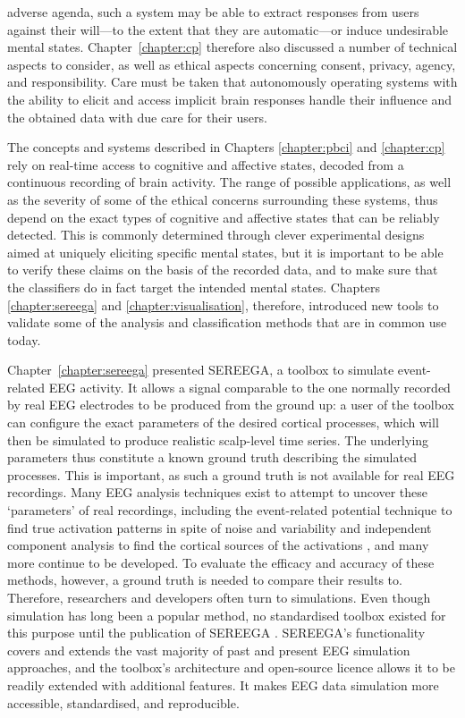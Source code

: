 adverse agenda, such a system may be able to extract responses from users against their will---to the extent that they are automatic---or induce undesirable mental states. Chapter~\ref{chapter:cp} therefore also discussed a number of technical aspects to consider, as well as ethical aspects concerning consent, privacy, agency, and responsibility. Care must be taken that autonomously operating systems with the ability to elicit and access implicit brain responses handle their influence and the obtained data with due care for their users.

The concepts and systems described in Chapters \ref{chapter:pbci} and \ref{chapter:cp} rely on real-time access to cognitive and affective states, decoded from a continuous recording of brain activity. The range of possible applications, as well as the severity of some of the ethical concerns surrounding these systems, thus depend on the exact types of cognitive and affective states that can be reliably detected. This is commonly determined through clever experimental designs aimed at uniquely eliciting specific mental states, but it is important to be able to verify these claims on the basis of the recorded data, and to make sure that the classifiers do in fact target the intended mental states. Chapters \ref{chapter:sereega} and \ref{chapter:visualisation}, therefore, introduced new tools to validate some of the analysis and classification methods that are in common use today.

Chapter~\ref{chapter:sereega} presented SEREEGA, a toolbox to simulate event-related EEG activity. It allows a signal comparable to the one normally recorded by real EEG electrodes to be produced from the ground up: a user of the toolbox can configure the exact parameters of the desired cortical processes, which will then be simulated to produce realistic scalp-level time series. The underlying parameters thus constitute a known ground truth describing the simulated processes. This is important, as such a ground truth is not available for real EEG recordings. Many EEG analysis techniques exist to attempt to uncover these `parameters' of real recordings, including the event-related potential technique to find true activation patterns in spite of noise and variability \cite{luck2014erp} and independent component analysis to find the cortical sources of the activations \cite{makeig1996}, and many more continue to be developed. To evaluate the efficacy and accuracy of these methods, however, a ground truth is needed to compare their results to. Therefore, researchers and developers often turn to simulations. Even though simulation has long been a popular method, no standardised toolbox existed for this purpose until the publication of SEREEGA \cite{krol2018sereega}. SEREEGA's functionality covers and extends the vast majority of past and present EEG simulation approaches, and the toolbox's architecture and open-source licence allows it to be readily extended with additional features. It makes EEG data simulation more accessible, standardised, and reproducible. 

